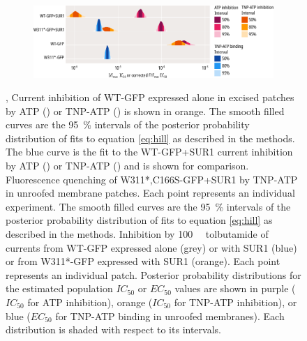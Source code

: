\begin{figure}[h]
\begin{subfigure}[t]{0.9\textwidth}
		\centering
		\includegraphics[width=\textwidth]{nosur_ec50s.pdf}
	\end{subfigure}
	\caption[SUR1 alters inhibition but not binding at Kir6.2]{
	,  Current inhibition of WT-GFP expressed alone in excised patches by ATP () or TNP-ATP () is shown in orange.
	The smooth filled curves are the \SI{95}{\percent} intervals of the posterior probability distribution of fits to equation \ref{eq:hill} as described in the methods.
	The blue curve is the fit to the WT-GFP+SUR1 current inhibition by ATP () or TNP-ATP () and is shown for comparison.
	 Fluorescence quenching of W311*,C166S-GFP+SUR1 by TNP-ATP in unroofed membrane patches.
	Each point represents an individual experiment.
	The smooth filled curves are the \SI{95}{\percent} intervals of the posterior probability distribution of fits to equation \ref{eq:hill} as described in the methods.
	 Inhibition by \SI{100}{\micro\Molar} tolbutamide of currents from WT-GFP expressed alone (grey) or with SUR1 (blue) or from W311*-GFP expressed with SUR1 (orange).
	Each point represents an individual patch.
	 Posterior probability distributions for the estimated population $IC_{50}$ or $EC_{50}$ values are shown in purple ($IC_{50}$ for ATP inhibition), orange ($IC_{50}$ for TNP-ATP inhibition), or blue ($EC_{50}$ for TNP-ATP binding in unroofed membranes).
	Each distribution is shaded with respect to its intervals.
	}\label{ch6fig:no_sur}
\end{figure}

